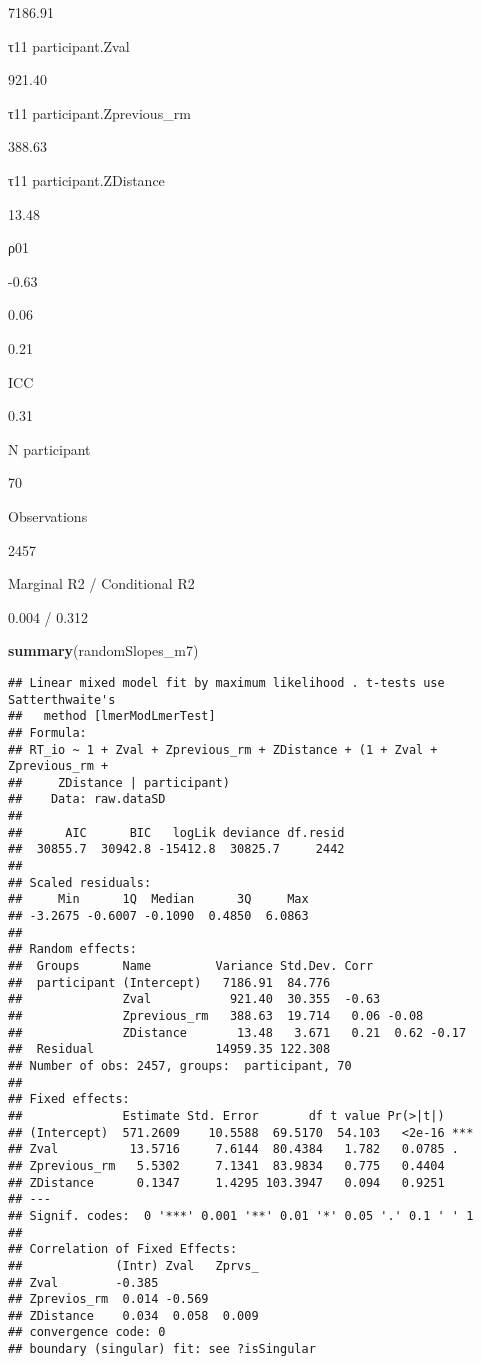 \documentclass[
]{article}
\newenvironment{Shaded}{\begin{snugshade}}{\end{snugshade}}
\newcommand{\KeywordTok}[1]{\textcolor[rgb]{0.13,0.29,0.53}{\textbf{#1}}}
\newcommand{\NormalTok}[1]{#1}
\begin{document}
7186.91

τ11 participant.Zval

921.40

τ11 participant.Zprevious\_rm

388.63

τ11 participant.ZDistance

13.48

ρ01

-0.63

0.06

0.21

ICC

0.31

N participant

70

Observations

2457

Marginal R2 / Conditional R2

0.004 / 0.312

\begin{Shaded}
\begin{Highlighting}[]
\KeywordTok{summary}\NormalTok{(randomSlopes_m7)}
\end{Highlighting}
\end{Shaded}

\begin{verbatim}
## Linear mixed model fit by maximum likelihood . t-tests use Satterthwaite's
##   method [lmerModLmerTest]
## Formula: 
## RT_io ~ 1 + Zval + Zprevious_rm + ZDistance + (1 + Zval + Zprevious_rm +  
##     ZDistance | participant)
##    Data: raw.dataSD
## 
##      AIC      BIC   logLik deviance df.resid 
##  30855.7  30942.8 -15412.8  30825.7     2442 
## 
## Scaled residuals: 
##     Min      1Q  Median      3Q     Max 
## -3.2675 -0.6007 -0.1090  0.4850  6.0863 
## 
## Random effects:
##  Groups      Name         Variance Std.Dev. Corr             
##  participant (Intercept)   7186.91  84.776                   
##              Zval           921.40  30.355  -0.63            
##              Zprevious_rm   388.63  19.714   0.06 -0.08      
##              ZDistance       13.48   3.671   0.21  0.62 -0.17
##  Residual                 14959.35 122.308                   
## Number of obs: 2457, groups:  participant, 70
## 
## Fixed effects:
##              Estimate Std. Error       df t value Pr(>|t|)    
## (Intercept)  571.2609    10.5588  69.5170  54.103   <2e-16 ***
## Zval          13.5716     7.6144  80.4384   1.782   0.0785 .  
## Zprevious_rm   5.5302     7.1341  83.9834   0.775   0.4404    
## ZDistance      0.1347     1.4295 103.3947   0.094   0.9251    
## ---
## Signif. codes:  0 '***' 0.001 '**' 0.01 '*' 0.05 '.' 0.1 ' ' 1
## 
## Correlation of Fixed Effects:
##             (Intr) Zval   Zprvs_
## Zval        -0.385              
## Zprevios_rm  0.014 -0.569       
## ZDistance    0.034  0.058  0.009
## convergence code: 0
## boundary (singular) fit: see ?isSingular
\end{verbatim}
\end{document}
